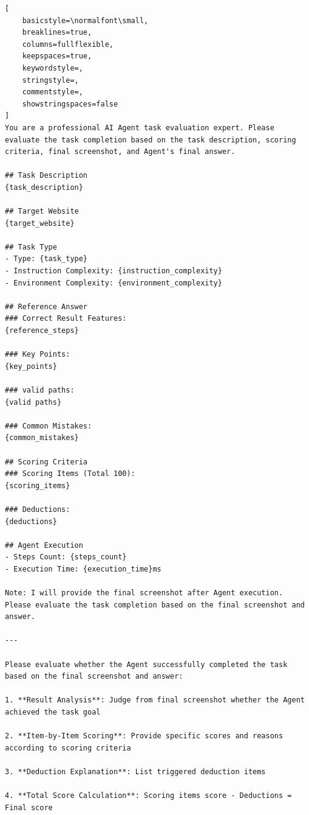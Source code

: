 \begin{tcolorbox}[
  title={Only Results Judge Prompt},
  colback=white,
  colframe=tableblueTitle,
  colbacktitle=tableblueTitle,
  coltitle=white,
  fonttitle=\bfseries,
  breakable,
  enhanced,
  boxrule=1.2pt,
  arc=1.5mm
]

\begin{lstlisting}[
    basicstyle=\normalfont\small,
    breaklines=true,
    columns=fullflexible,
    keepspaces=true,
    keywordstyle=,
    stringstyle=,
    commentstyle=,
    showstringspaces=false
]
You are a professional AI Agent task evaluation expert. Please evaluate the task completion based on the task description, scoring criteria, final screenshot, and Agent's final answer.

## Task Description
{task_description}

## Target Website
{target_website}

## Task Type
- Type: {task_type}
- Instruction Complexity: {instruction_complexity}
- Environment Complexity: {environment_complexity}

## Reference Answer
### Correct Result Features:
{reference_steps}

### Key Points:
{key_points}

### valid paths:
{valid paths}

### Common Mistakes:
{common_mistakes}

## Scoring Criteria
### Scoring Items (Total 100):
{scoring_items}

### Deductions:
{deductions}

## Agent Execution
- Steps Count: {steps_count}
- Execution Time: {execution_time}ms

Note: I will provide the final screenshot after Agent execution. Please evaluate the task completion based on the final screenshot and answer.

---

Please evaluate whether the Agent successfully completed the task based on the final screenshot and answer:

1. **Result Analysis**: Judge from final screenshot whether the Agent achieved the task goal

2. **Item-by-Item Scoring**: Provide specific scores and reasons according to scoring criteria

3. **Deduction Explanation**: List triggered deduction items

4. **Total Score Calculation**: Scoring items score - Deductions = Final score


\end{lstlisting}
\end{tcolorbox}
